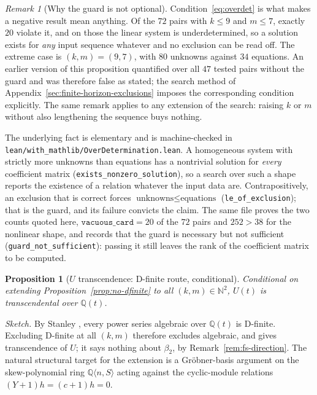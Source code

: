 \documentclass[11pt]{article}
\theoremstyle{plain}
\newtheorem{proposition}[theorem]{Proposition}
\theoremstyle{definition}
\theoremstyle{remark}
\newtheorem{remark}[theorem]{Remark}
\begin{document}
\begin{remark}[Why the guard is not optional]
\label{rem:overdet}
Condition~\eqref{eq:overdet} is what makes a negative result mean
anything. Of the $72$ pairs with $k \le 9$ and $m \le 7$, exactly $20$
violate it, and on those the linear system is underdetermined, so a
solution exists for \emph{any} input sequence whatever and no exclusion
can be read off. The extreme case is $(k,m) = (9,7)$, with $80$ unknowns
against $34$ equations. An earlier version of this proposition quantified
over all $47$ tested pairs without the guard and was therefore false as
stated; the search method of Appendix~\ref{sec:finite-horizon-exclusions}
imposes the corresponding condition explicitly. The same remark applies to
any extension of the search: raising $k$ or $m$ without also lengthening
the sequence buys nothing.

The underlying fact is elementary and is machine-checked in
\texttt{lean/with\_mathlib/OverDetermination.lean}. A homogeneous system
with strictly more unknowns than equations has a nontrivial solution for
\emph{every} coefficient matrix (\texttt{exists\_nonzero\_solution}),
so a search over such a shape reports the existence of a relation
whatever the input data are. Contrapositively, an exclusion that is
correct forces $\text{unknowns} \le \text{equations}$
(\texttt{le\_of\_exclusion}); that is the guard, and its failure convicts
the claim. The same file proves the two counts quoted here,
$\texttt{vacuous\_card} = 20$ of the $72$ pairs and
$252 > 38$ for the nonlinear shape, and records that the guard is
necessary but not sufficient (\texttt{guard\_not\_sufficient}): passing
it still leaves the rank of the coefficient matrix to be computed.
\end{remark}

\begin{proposition}[$U$ transcendence: D-finite route, conditional]
\label{prop:beta2-dfinite}
Conditional on extending Proposition~\ref{prop:no-dfinite} to all
$(k, m) \in \mathbb{N}^2$, $U(t)$ is transcendental over $\mathbb{Q}(t)$.
\end{proposition}

\emph{Sketch.}  By Stanley \cite[Thm.~6.4.6]{Stanley1999}, every power series
algebraic over $\mathbb{Q}(t)$ is
D-finite.  Excluding D-finite at all $(k, m)$ therefore excludes
algebraic, and gives transcendence of $U$; it says nothing about
$\beta_2$, by Remark~\ref{rem:fs-direction}.  The natural
structural target for the extension is a Gr\"obner-basis argument on
the skew-polynomial ring $\mathbb{Q}\langle n, S\rangle$ acting against
the cyclic-module relations $(Y+1)h = (c+1)h = 0$.
\end{document}
